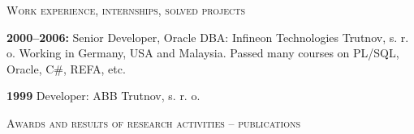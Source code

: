 \documentclass[10pt]{article}
\begin{document}
\begin{cv}
\begin{cvlist}{\large \textsc{Work experience, internships, solved projects}}
\item {\bf{2000--2006:}} Senior Developer, Oracle DBA: Infineon
  Technologies Trutnov, s. r. o. Working in Germany, USA and
  Malaysia. Passed many courses on PL/SQL, Oracle, C\#, REFA, etc.

\item {\bf{1999}} Developer: ABB Trutnov, s. r. o.




\end{cvlist}




\noindent\hrulefill
\begin{cvlist}{\large \textsc{Awards and results of research activities -- publications}}







\end{cvlist}
\end{cv}
\end{document}
